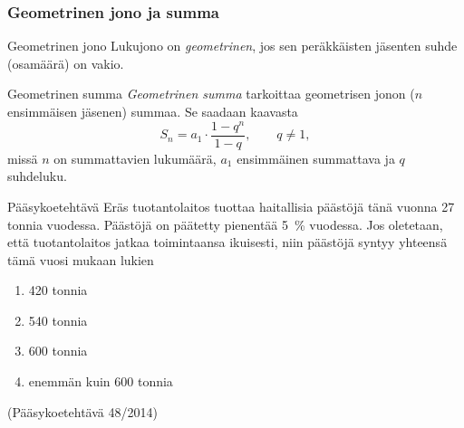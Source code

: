\documentclass{article}\usepackage[]{graphicx}\usepackage[]{color}
\theoremstyle{remark}
\begin{document}
\begin{frame}
    \frametitle{Geometrinen jono ja summa}
    \pause
    \begin{block}{Geometrinen jono}
        Lukujono on \emph{geometrinen}, jos sen peräkkäisten jäsenten suhde (osamäärä) on vakio.
    \end{block}
    \pause
    \begin{block}{Geometrinen summa}
        \emph{Geometrinen summa} tarkoittaa geometrisen jonon ($n$ ensimmäisen jäsenen) summaa. Se saadaan kaavasta
        \[
            S_n = a_1\cdot \frac{1-q^n}{1-q}, \qquad q\neq 1,
        \] \pause
        missä \(n\) on summattavien lukumäärä,
        \pause \(a_1\) ensimmäinen summattava
        \pause ja \(q\) suhdeluku.
    \end{block}
\end{frame}

\begin{frame}
  \begin{block}{Pääsykoetehtävä}
    Eräs tuotantolaitos tuottaa haitallisia päästöjä tänä vuonna 27 tonnia vuodessa.
Päästöjä on päätetty pienentää 5~\% vuodessa. Jos oletetaan, että tuotantolaitos jatkaa
toimintaansa ikuisesti, niin päästöjä syntyy yhteensä tämä vuosi mukaan lukien
    \begin{enumerate}
      \item 420 tonnia
      \item 540 tonnia
      \item 600 tonnia
      \item enemmän kuin 600 tonnia
    \end{enumerate}
    (Pääsykoetehtävä 48/2014)
  \end{block}
\end{frame}
\end{document}
